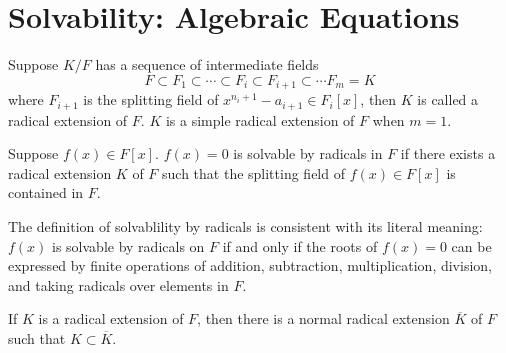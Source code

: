\section{Solvability: Algebraic Equations}
\begin{definition}
    Suppose $K/F$ has a sequence of intermediate fields
    $$
    F\subset F_1\subset\cdots\subset F_i\subset F_{i+1}\subset\cdots F_m=K
    $$
    where $F_{i+1}$ is the splitting field of $x^{n_i+1}-a_{i+1}\in F_{i}[x]$, then $K$ is called a radical extension of $F$. $K$ is a simple radical extension of $F$ when $m=1$.
\end{definition}
\begin{definition}
    Suppose $f(x)\in F[x]$. $f(x)=0$ is solvable by radicals in $F$ if there exists a radical extension $K$ of $F$ such that the splitting field of $f(x)\in F[x]$ is contained in $F$.
\end{definition}
\begin{remark}
    The definition of solvablility by radicals is consistent with its literal meaning: $f(x)$ is solvable by radicals on $F$ if and only if the roots of $f(x)=0$ can be expressed by finite operations of addition, subtraction, multiplication, division, and taking radicals over elements in $F$.
\end{remark}
\begin{proposition}
    If $K$ is a radical extension of $F$, then there is a normal radical extension $\overline{K}$ of $F$ such that $K\subset\overline{K}$.
\end{proposition}
